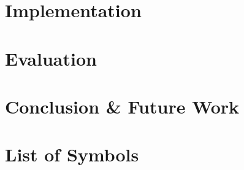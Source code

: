 \documentclass[bachelor,english]{infothesis}
\begin{document}
\chapter{Implementation}
	

%	

\chapter{Evaluation}
	

\chapter{Conclusion \& Future Work}
	

%	
	
\chapter*{List of Symbols}
\end{document}

